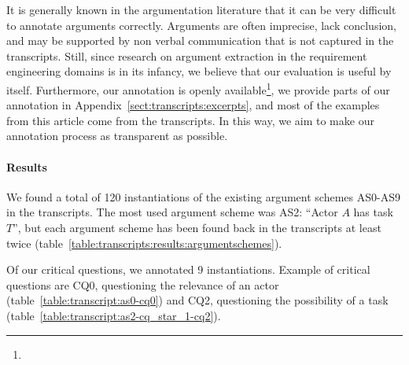 It is generally known in the argumentation literature that it can be very difficult to annotate arguments correctly. Arguments are often imprecise, lack conclusion, and may be supported by non verbal communication that is not captured in the transcripts. Still, since research on argument extraction in the requirement engineering domains is in its infancy, we believe that our evaluation is useful by itself. Furthermore, our annotation is openly available\footnote{}, we provide parts of our annotation in Appendix~\ref{sect:transcripts:excerpts}, and most of the examples from this article come from the transcripts. In this way, we aim to make our annotation process as transparent as possible.

\paragraph{Results}

We found a total of 120 instantiations of the existing argument schemes AS0-AS9 in the transcripts. The most used argument scheme was AS2: ``Actor $A$ has task $T$'', but each argument scheme has been found back in the transcripts at least twice (table~\ref{table:transcripts:results:argumentschemes}). 

Of our critical questions, we annotated 9 instantiations. Example of critical questions are CQ0, questioning the relevance of an actor (table~\ref{table:transcript:as0-cq0}) and CQ2, questioning the possibility of a task (table~\ref{table:transcript:as2-cq_star_1-cq2}).

